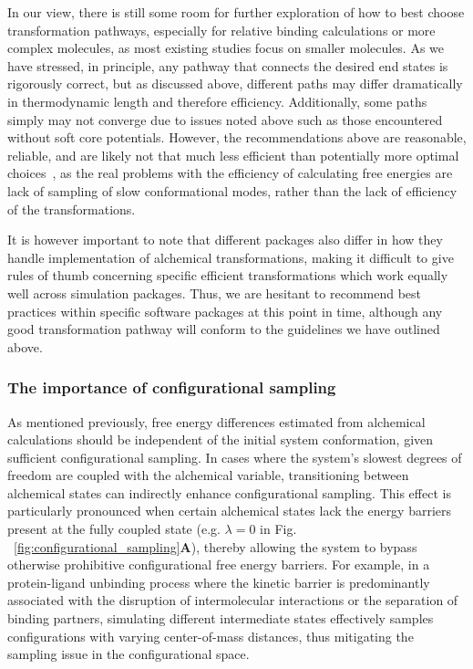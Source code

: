 \documentclass[9pt,bestpractices,pubversion]{livecoms}
\begin{document}
In our view, there is still some room for further exploration of how to best choose transformation pathways, especially for relative binding calculations or more complex molecules, as most existing studies focus on smaller molecules. As we have stressed, in principle, any pathway that connects the desired end states is rigorously correct, but as discussed above, different paths may differ dramatically in thermodynamic length and therefore efficiency. Additionally, some paths simply may not converge due to issues noted above such as those encountered without soft core potentials. However, the recommendations above are reasonable, reliable, and are likely not that much less efficient than potentially more optimal choices~\cite{naden2014linear,naden2015linear,pham2012optimal}, as the real problems with the efficiency of calculating free energies are lack of sampling of slow conformational modes, rather than the lack of efficiency of the transformations. 

It is however important to note that different packages also differ in how they handle implementation of alchemical transformations, making it difficult to give rules of thumb concerning specific efficient transformations which work equally well across simulation packages. Thus, we are hesitant to recommend best practices within specific software packages at this point in time, although any good transformation pathway will conform to the guidelines we have outlined above.

\subsubsection{The importance of configurational sampling}
\label{sec:configurational_sampling}
As mentioned previously, free energy differences estimated from alchemical calculations should be independent of the initial system conformation, given sufficient configurational sampling. In cases where the system's slowest degrees of freedom are coupled with the alchemical variable, transitioning between alchemical states can indirectly enhance configurational sampling. This effect is particularly pronounced when certain alchemical states lack the energy barriers present at the fully coupled state (e.g. $\lambda=0$ in Fig. ~\ref{fig:configurational_sampling}\textbf{A}), thereby allowing the system to bypass otherwise prohibitive configurational free energy barriers. For example, in a protein-ligand unbinding process where the kinetic barrier is predominantly associated with the disruption of intermolecular interactions or the separation of binding partners, simulating different intermediate states effectively samples configurations with varying center-of-mass distances, thus mitigating the sampling issue in the configurational space. 
\end{document}

